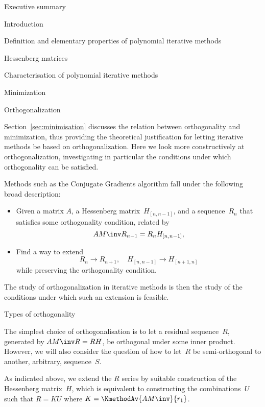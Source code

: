 \documentclass[11pt]{artikel3}
\begin{document}
\begin{Outline}
 {Executive summary}



 {Introduction}


 {Definition and elementary properties of polynomial
iterative methods}


 {Hessenberg matrices}
\label{sec:hessenberg}


 {Characterisation of polynomial iterative methods}


 {Minimization}\label{sec:minimisation}


 {Orthogonalization}
\label{ch:ortho}

Section~\ref{sec:minimisation} discusses the relation between orthogonality
and minimization, thus providing the theoretical justification for 
letting iterative methods be based on orthogonalization. Here we
look more constructively at orthogonalization, investigating in particular
the conditions under which orthogonality can be satisfied.

Methods such as the Conjugate Gradients algorithm fall under the 
following broad description:
\begin{itemize}\item
Given a matrix $A$, a Hessenberg matrix~$H_{[n,n-1]}$,
and a sequence~$R_n$ that satisfies some orthogonality condition,
related by \[ AM\inv R_{n-1}=R_nH_{[n,n-1]}, \]
\item Find a way to extend
\[ R_n\rightarrow R_{n+1},\quad H_{[n,n-1]}\rightarrow H_{[n+1,n]} \]
while preserving the orthogonality condition.
\end{itemize}
The study of orthogonalization in iterative methods is then
the study of the conditions under which
such an extension is feasible.

 {Types of orthogonality}
\label{sec:ortho-types}

The simplest choice of orthogonalisation is to let a residual
sequence~$R$, generated by $AM\inv R=RH$, be orthogonal under some
inner product. However, we will also consider the question of how to
let~$R$ be semi-orthogonal to another, arbitrary, sequence~$S$.

As indicated above, we extend the $R$ series by suitable construction
of the Hessenberg matrix~$H$, which is equivalent to constructing the
combinations~$U$ such that $R=KU$ where $K=\KmethodAv{AM\inv}{r_1}$.


\end{Outline}
\end{document}
